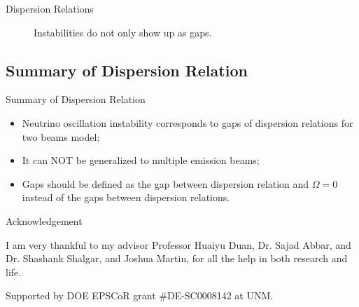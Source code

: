\documentclass[9pt]{beamer}
\begin{document}
\begin{darkframes}
\begin{frame}{Dispersion Relations}
\begin{figure}
    \pause
    \begin{tcolorbox}
      Instabilities do not only show up as gaps.
    \end{tcolorbox}
   \end{figure}



\end{frame}


\subsection{Summary of Dispersion Relation}

\begin{frame}{Summary of Dispersion Relation}

\begin{itemize}
   \item Neutrino oscillation instability corresponds to gaps of dispersion relations for two beams model;
   \item It can NOT be generalized to multiple emission beams;
   \item Gaps should be defined as the gap between dispersion relation and $\Omega=0$ instead of the gaps between dispersion relations.
\end{itemize}

\end{frame}








\begin{frame}{Acknowledgement}

I am very thankful to my advisor Professor Huaiyu Duan, Dr. Sajad Abbar, and Dr. Shashank Shalgar, and Joshua Martin, for all the help in both research and life.

Supported by DOE EPSCoR grant \#DE-SC0008142 at UNM.

\end{frame}







\end{darkframes}
\end{document}
